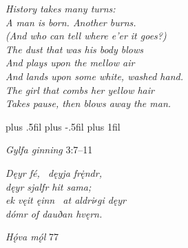 \vfill


\newpage\thispagestyle{empty}

\vspace*{\fill}

\begin{center}{\huge \emph{History takes many turns: \\
A man is born. Another burns. \\
(And who can tell where e'er it goes?) \\
The dust that was his body blows \\
And plays upon the mellow air \\%
And lands upon some white, washed hand. \\
The girl that combs her yellow hair \\%
Takes pause, then blows away the man. \\}}
\end{center}

\vfill


\newpage\thispagestyle{empty}

\vspace*{\fill}

{\leftskip=0pt plus .5fil \rightskip=0pt plus -.5fil \parfillskip=0pt plus 1fil
\par}
\begin{flushright}%
\emph{Gylfa ginning} 3:7--11%
\end{flushright}

\vspace{5mm}

\begin{center}{\Large \emph{Dęyr fé, \hld\ dęyja frę̇ndr, \\
dęyr sjalfr hit sama; \\
ek vęit ęinn \hld\ at aldri⸗gi dęyr \\
dómr of dauðan hvęrn.}}\end{center}

\begin{flushright}%
\emph{Hǫ́va mǫ́l} 77%
\end{flushright}

